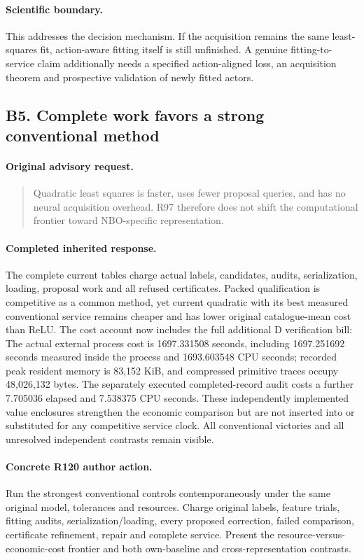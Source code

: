 \paragraph{Scientific boundary.}
This addresses the decision mechanism. If the acquisition remains the same least-squares fit, action-aware fitting itself is still unfinished. A genuine fitting-to-service claim additionally needs a specified action-aligned loss, an acquisition theorem and prospective validation of newly fitted actors.

\subsection{B5. Complete work favors a strong conventional method}
\label{response120:B5}
\paragraph{Original advisory request.}
\begin{quote}
Quadratic least squares is faster, uses fewer proposal queries, and has no neural acquisition overhead. R97 therefore does not shift the computational frontier toward NBO-specific representation.
\end{quote}
\paragraph{Completed inherited response.}
The complete current tables charge actual labels, candidates, audits, serialization, loading, proposal work and all refused certificates. Packed qualification is competitive as a common method, yet current quadratic with its best measured conventional service remains cheaper and has lower original catalogue-mean cost than ReLU. The cost account now includes the full additional D verification bill: The actual external process cost is 1697.331508 seconds, including 1697.251692 seconds measured inside the process and 1693.603548 CPU seconds; recorded peak resident memory is 83,152 KiB, and compressed primitive traces occupy 48,026,132 bytes. The separately executed completed-record audit costs a further 7.705036 elapsed and 7.538375 CPU seconds. These independently implemented value enclosures strengthen the economic comparison but are not inserted into or substituted for any competitive service clock. All conventional victories and all unresolved independent contrasts remain visible.
\paragraph{Concrete R120 author action.}
Run the strongest conventional controls contemporaneously under the same original model, tolerances and resources. Charge original labels, feature trials, fitting audits, serialization/loading, every proposed correction, failed comparison, certificate refinement, repair and complete service. Present the resource-versus-economic-cost frontier and both own-baseline and cross-representation contrasts.
